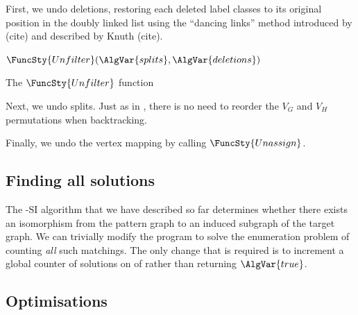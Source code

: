 First, we undo deletions, restoring each deleted label classes to its
original position in the doubly linked list using the ``dancing links'' method
introduced by (cite) and described by Knuth (cite).

\begin{algorithm}[htb]
\AlgorithmFontSize
\DontPrintSemicolon
\nl $\FuncSty{Unfilter}(\AlgVar{splits}, \AlgVar{deletions})$ \;
\nl {}
\caption{The $\FuncSty{Unfilter}$ function}
\label{McSplitSIAlgUnfilter}
\end{algorithm}

Next, we undo splits.  Just as in \McSplit, there is
no need to reorder the $V_G$ and $V_H$ permutations when backtracking.

Finally, we undo the vertex mapping by calling $\FuncSty{Unassign}$.

\FloatBarrier

\subsection{Finding all solutions}

The \McSplit-SI algorithm that we have described so far determines whether there
exists an isomorphism from the pattern graph to an induced subgraph of the target
graph.  We can trivially modify the program to solve the enumeration problem
of counting \emph{all} such matchings.  The only change that is required is
to increment a global counter of solutions on
 of  rather than returning
$\AlgVar{true}$.

\subsection{Optimisations}\label{sec:mcsplit-si-optimisations}

